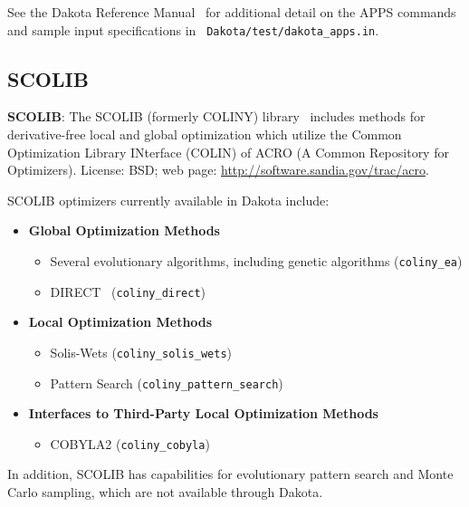 See the Dakota Reference Manual~\cite{RefMan} for additional detail on
the APPS commands and sample input specifications in {\tt
Dakota/test/dakota\_apps.in}.

\subsection{SCOLIB}\label{opt:software:coliny}

\textbf{SCOLIB}: The SCOLIB (formerly COLINY) library~\cite{Har06}
includes methods for derivative-free local and global optimization
which utilize the Common Optimization Library INterface (COLIN) of
ACRO (A Common Repository for Optimizers). License: BSD; web page:
\url{http://software.sandia.gov/trac/acro}.

SCOLIB optimizers currently available in Dakota include:
\begin{itemize}

\item {\bf Global Optimization Methods}
  \begin{itemize}
  \item Several evolutionary algorithms, including genetic algorithms
    (\texttt{coliny\_ea})
  \item DIRECT~\cite{Per93} (\texttt{coliny\_direct})
  \end{itemize}

\item {\bf Local Optimization Methods}
  \begin{itemize}
  \item Solis-Wets (\texttt{coliny\_solis\_wets})
  \item Pattern Search (\texttt{coliny\_pattern\_search})
  \end{itemize}

\item {\bf Interfaces to Third-Party Local Optimization Methods}
  \begin{itemize}
  \item COBYLA2 (\texttt{coliny\_cobyla})
  \end{itemize}

\end{itemize}
In addition, SCOLIB has capabilities for evolutionary pattern search
and Monte Carlo sampling, which are not available through Dakota.


